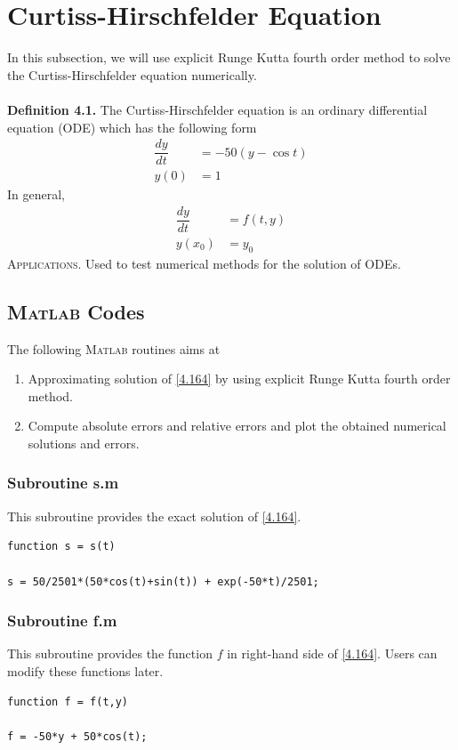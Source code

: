 \documentclass[a4paper,oneside]{book}
\numberwithin{equation}{chapter}
\begin{document}
\section{Curtiss-Hirschfelder Equation}
In this subsection, we will use explicit Runge Kutta fourth order method to solve the Curtiss-Hirschfelder equation numerically.\\
\\
\textbf{Definition 4.1.} The Curtiss-Hirschfelder equation is an ordinary differential equation (ODE) which has the following form
\begin{align}
\label{4.164}
\dfrac{{dy}}{{dt}} &=  - 50\left( {y - \cos t} \right)\\
y\left( 0 \right) &= 1
\end{align}
In general, 
\begin{align}
\dfrac{{dy}}{{dt}} &= f\left( {t,y} \right)\\
y\left( {{x_0}} \right) &= {y_0}
\end{align}
\textsc{Applications.} Used to test numerical methods for the solution of ODEs.
\subsection{\textsc{Matlab} Codes}
The following \textsc{Matlab} routines aims at
\begin{enumerate}
\item Approximating solution of \eqref{4.164} by using explicit Runge Kutta fourth order method.
\item Compute absolute errors and relative errors and plot the obtained numerical solutions and errors.
\end{enumerate}
\subsubsection{Subroutine s.m}
This subroutine provides the exact solution of \eqref{4.164}.
\begin{verbatim}
function s = s(t)

s = 50/2501*(50*cos(t)+sin(t)) + exp(-50*t)/2501;
\end{verbatim}
\subsubsection{Subroutine f.m}
This subroutine provides the function $f$ in right-hand side of \eqref{4.164}. Users can modify these functions later.
\begin{verbatim}
function f = f(t,y)

f = -50*y + 50*cos(t);
\end{verbatim}
\end{document}

